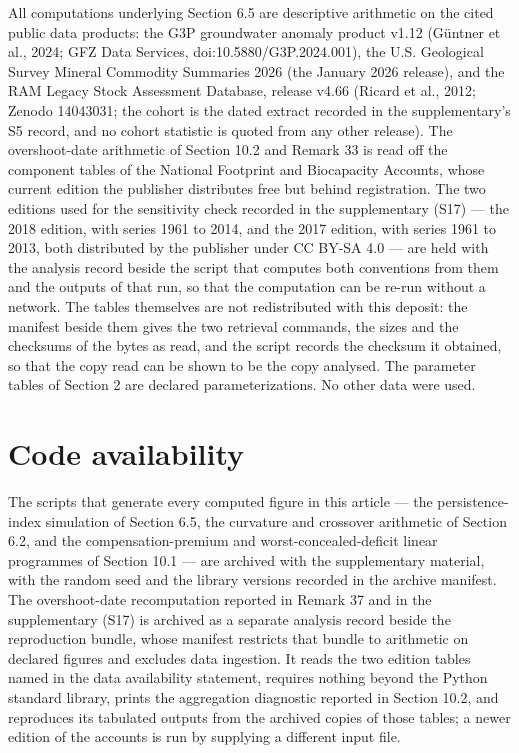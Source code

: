 \documentclass[11pt]{article}
\begin{document}
All computations underlying Section 6.5 are descriptive arithmetic on the cited public data products: the G3P groundwater anomaly product v1.12 (G\"{u}ntner et al., 2024; GFZ Data Services, doi:10.5880/\allowbreak{}G3P.2024.001), the U.S. Geological Survey Mineral Commodity Summaries 2026 (the January 2026 release), and the RAM Legacy Stock Assessment Database, release v4.66 (Ricard et al., 2012; Zenodo 14043031; the cohort is the dated extract recorded in the supplementary's S5 record, and no cohort statistic is quoted from any other release). The overshoot-date arithmetic of Section 10.2 and Remark 33 is read off the component tables of the National Footprint and Biocapacity Accounts, whose current edition the publisher distributes free but behind registration. The two editions used for the sensitivity check recorded in the supplementary (S17) --- the 2018 edition, with series 1961 to 2014, and the 2017 edition, with series 1961 to 2013, both distributed by the publisher under CC BY-SA 4.0 --- are held with the analysis record beside the script that computes both conventions from them and the outputs of that run, so that the computation can be re-run without a network. The tables themselves are not redistributed with this deposit: the manifest beside them gives the two retrieval commands, the sizes and the checksums of the bytes as read, and the script records the checksum it obtained, so that the copy read can be shown to be the copy analysed. The parameter tables of Section 2 are declared parameterizations. No other data were used.

\section*{Code availability}\label{code-availability}

The scripts that generate every computed figure in this article --- the persistence-index simulation of Section 6.5, the curvature and crossover arithmetic of Section 6.2, and the compensation-premium and worst-concealed-deficit linear programmes of Section 10.1 --- are archived with the supplementary material, with the random seed and the library versions recorded in the archive manifest. The overshoot-date recomputation reported in Remark 37 and in the supplementary (S17) is archived as a separate analysis record beside the reproduction bundle, whose manifest restricts that bundle to arithmetic on declared figures and excludes data ingestion. It reads the two edition tables named in the data availability statement, requires nothing beyond the Python standard library, prints the aggregation diagnostic reported in Section 10.2, and reproduces its tabulated outputs from the archived copies of those tables; a newer edition of the accounts is run by supplying a different input file.
\end{document}
